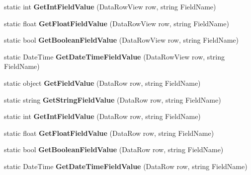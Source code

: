 \begin{DoxyCompactItemize}
\item 
\hypertarget{class_base_view_aee131b709c6481077614865f7cbbce7a}{static int {\bfseries Get\-Int\-Field\-Value} (Data\-Row\-View row, string Field\-Name)}\label{class_base_view_aee131b709c6481077614865f7cbbce7a}

\item 
\hypertarget{class_base_view_aa056dee2dc0c2cd5ff34884361d8bd10}{static float {\bfseries Get\-Float\-Field\-Value} (Data\-Row\-View row, string Field\-Name)}\label{class_base_view_aa056dee2dc0c2cd5ff34884361d8bd10}

\item 
\hypertarget{class_base_view_ae379527e4bc9a1bca6cf2f77178417ad}{static bool {\bfseries Get\-Boolean\-Field\-Value} (Data\-Row\-View row, string Field\-Name)}\label{class_base_view_ae379527e4bc9a1bca6cf2f77178417ad}

\item 
\hypertarget{class_base_view_af613b200a3e6af0008709682f1e348ab}{static Date\-Time {\bfseries Get\-Date\-Time\-Field\-Value} (Data\-Row\-View row, string Field\-Name)}\label{class_base_view_af613b200a3e6af0008709682f1e348ab}

\item 
\hypertarget{class_base_view_aac24e88201088813b95a188e7dcef889}{static object {\bfseries Get\-Field\-Value} (Data\-Row row, string Field\-Name)}\label{class_base_view_aac24e88201088813b95a188e7dcef889}

\item 
\hypertarget{class_base_view_ac0018e7a447381abbee001b2e903c78c}{static string {\bfseries Get\-String\-Field\-Value} (Data\-Row row, string Field\-Name)}\label{class_base_view_ac0018e7a447381abbee001b2e903c78c}

\item 
\hypertarget{class_base_view_a9c6ebaafc61e2f042c55ee97189f1497}{static int {\bfseries Get\-Int\-Field\-Value} (Data\-Row row, string Field\-Name)}\label{class_base_view_a9c6ebaafc61e2f042c55ee97189f1497}

\item 
\hypertarget{class_base_view_a06679ddf26b8e36a6ce116952df39250}{static float {\bfseries Get\-Float\-Field\-Value} (Data\-Row row, string Field\-Name)}\label{class_base_view_a06679ddf26b8e36a6ce116952df39250}

\item 
\hypertarget{class_base_view_a0855871070c29d7033c50bcdd92e48b9}{static bool {\bfseries Get\-Boolean\-Field\-Value} (Data\-Row row, string Field\-Name)}\label{class_base_view_a0855871070c29d7033c50bcdd92e48b9}

\item 
\hypertarget{class_base_view_a5a1c6de2aebce9b7f327b78ea547b9cb}{static Date\-Time {\bfseries Get\-Date\-Time\-Field\-Value} (Data\-Row row, string Field\-Name)}\label{class_base_view_a5a1c6de2aebce9b7f327b78ea547b9cb}

\end{DoxyCompactItemize}



